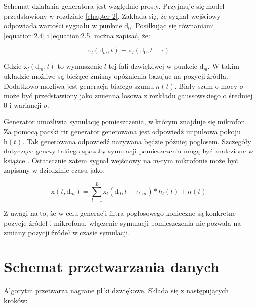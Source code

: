 \noindent Schemat działania generatora jest względnie prosty. Przyjmuje się model przedstawiony w rozdziale \ref{chapter-2}. Zakłada się, że sygnał wejściowy odpowiada wartości sygnału w punkcie $\bm{\mathrm{d}}_{0}$. Posiłkując się równaniami \eqref{equation:2.4} i \eqref{equation:2.5} można zapisać, że:

\begin{equation}
    \label{equation:delay model}
    \mathrm{x}_{l}(\bm{\mathrm{d}}_{m},t) = 
    \mathrm{x}_{l}(\bm{\mathrm{d}}_{0},t-\tau)
\end{equation}

\noindent Gdzie $\mathrm{x}_{l}(\bm{\mathrm{d}}_{m},t)$ to wymuszenie $l$-tej fali dzwiękowej w punkcie $\bm{\mathrm{d}}_{m}$. W takim układzie możliwe są bieżące zmiany opóźnienia bazując na pozycji źródła. Dodatkowo możliwa jest generacja białego szumu $n(t)$. Biały szum o mocy $\sigma$ może być przedstawiony jako zmienna losowa z rozkładu gaussowskiego o średniej 0 i wariancji $\sigma$.

\noindent Generator umożliwia symulację pomieszczenia, w  którym znajduje się mikrofon. Za pomocą paczki rir generator \cite{rir} generowana jest odpowiedź impulsowa pokoju $\bm{\mathrm{h}}(t)$. Tak generowana odpowiedź nazywana będzie później pogłosem. Szczegóły dotyczące genezy takiego sposoby symulacji pomieszczenia mogą być znalezione w książce \cite{Kuttruff}. Ostatecznie zatem sygnał wejściowy na $m$-tym mikrofonie może być zapisany w dziedzinie czasu jako:

\begin{equation}
    \label{equation:full generator}
    \mathrm{x}(t,\bm{\mathrm{d}}_{m})=
    \sum_{l=1}^{L}
    \mathrm{x}_{l}(\bm{\mathrm{d}}_{0},t-\tau_{l,m})*
    h_{l}(t)+ n(t)
\end{equation}

\noindent Z uwagi na to, że w celu generacji filtra pogłosowego konieczne są konkretne pozycje źródeł i mikrofonu, włączenie symulacji pomieszczenia nie pozwala na zmiany pozycji źródeł w czasie symulacji.




\section{Schemat przetwarzania danych}

Algorytm przetwarza nagrane pliki dzwiękowe. Składa się z następujących kroków:

